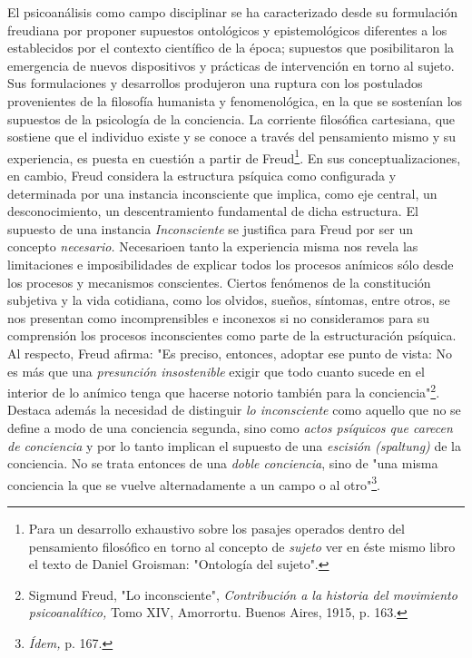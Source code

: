 \documentclass{book}
\begin{document}
El psicoanálisis como campo disciplinar se ha caracterizado desde su
formulación freudiana por proponer supuestos ontológicos y
epistemológicos diferentes a los establecidos por el contexto científico
de la época; supuestos que posibilitaron la emergencia de nuevos
dispositivos y prácticas de intervención en torno al sujeto. Sus
formulaciones y desarrollos produjeron una ruptura con los postulados
provenientes de la filosofía humanista y fenomenológica, en la que se
sostenían los supuestos de la psicología de la conciencia. La corriente
filosófica cartesiana, que sostiene que el individuo existe y se conoce
a través del pensamiento mismo y su experiencia, es puesta en cuestión a
partir de Freud\footnote{Para un desarrollo exhaustivo sobre los pasajes
  operados dentro del pensamiento filosófico en torno al concepto de
  \emph{sujeto} ver en éste mismo libro el texto de Daniel Groisman:
  "Ontología del sujeto".}. En sus conceptualizaciones, en cambio, Freud
considera la estructura psíquica como configurada y determinada por una
instancia inconsciente que implica, como eje central, un
desconocimiento, un descentramiento fundamental de dicha estructura. El
supuesto de una instancia \emph{Inconsciente} se justifica para Freud
por ser un concepto \emph{necesario.} Necesarioen tanto la experiencia
misma nos revela las limitaciones e imposibilidades de explicar todos
los procesos anímicos sólo desde los procesos y mecanismos conscientes.
Ciertos fenómenos de la constitución subjetiva y la vida cotidiana, como
los olvidos, sueños, síntomas, entre otros, se nos presentan como
incomprensibles e inconexos si no consideramos para su comprensión los
procesos inconscientes como parte de la estructuración psíquica. Al
respecto, Freud afirma: "Es preciso, entonces, adoptar ese punto de
vista: No es más que una \emph{presunción insostenible} exigir que todo
cuanto sucede en el interior de lo anímico tenga que hacerse notorio
también para la conciencia"\footnote{Sigmund Freud, "Lo inconsciente",
  \emph{Contribución a la historia del movimiento psicoanalítico,} Tomo
  XIV, Amorrortu. Buenos Aires, 1915, p. 163.}. Destaca además la
necesidad de distinguir \emph{lo inconsciente} como aquello que no se
define a modo de una conciencia segunda, sino como \emph{actos psíquicos
que carecen de conciencia} y por lo tanto implican el supuesto de una
\emph{escisión (spaltung)} de la conciencia. No se trata entonces de una
\emph{doble conciencia}, sino de "una misma conciencia la que se vuelve
alternadamente a un campo o al otro"\footnote{\emph{Ídem,} p. 167.}.
\end{document}
